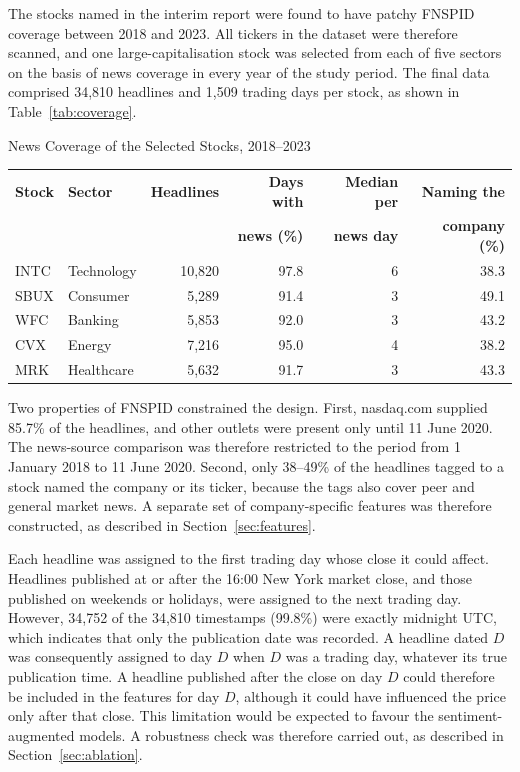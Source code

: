 The stocks named in the interim report were found to have patchy FNSPID coverage between 2018 and 2023. All tickers in the dataset were therefore scanned, and one large-capitalisation stock was selected from each of five sectors on the basis of news coverage in every year of the study period. The final data comprised 34,810 headlines and 1,509 trading days per stock, as shown in Table~\ref{tab:coverage}.

\begin{utptable}{News Coverage of the Selected Stocks, 2018--2023}
\label{tab:coverage}
\begin{tabular}{@{}llrrrr@{}}
\toprule
\textbf{Stock} & \textbf{Sector} & \textbf{Headlines} & \textbf{Days with} & \textbf{Median per} & \textbf{Naming the} \\
 & & & \textbf{news (\%)} & \textbf{news day} & \textbf{company (\%)} \\
\midrule
INTC & Technology & 10,820 & 97.8 & 6 & 38.3 \\
SBUX & Consumer & 5,289 & 91.4 & 3 & 49.1 \\
WFC & Banking & 5,853 & 92.0 & 3 & 43.2 \\
CVX & Energy & 7,216 & 95.0 & 4 & 38.2 \\
MRK & Healthcare & 5,632 & 91.7 & 3 & 43.3 \\
\bottomrule
\end{tabular}
\end{utptable}

Two properties of FNSPID constrained the design. First, nasdaq.com supplied 85.7\% of the headlines, and other outlets were present only until 11 June 2020. The news-source comparison was therefore restricted to the period from 1 January 2018 to 11 June 2020. Second, only 38--49\% of the headlines tagged to a stock named the company or its ticker, because the tags also cover peer and general market news. A separate set of company-specific features was therefore constructed, as described in Section~\ref{sec:features}.

Each headline was assigned to the first trading day whose close it could affect. Headlines published at or after the 16:00 New York market close, and those published on weekends or holidays, were assigned to the next trading day. However, 34,752 of the 34,810 timestamps (99.8\%) were exactly midnight UTC, which indicates that only the publication date was recorded. A headline dated $D$ was consequently assigned to day $D$ when $D$ was a trading day, whatever its true publication time. A headline published after the close on day $D$ could therefore be included in the features for day $D$, although it could have influenced the price only after that close. This limitation would be expected to favour the sentiment-augmented models. A robustness check was therefore carried out, as described in Section~\ref{sec:ablation}.

